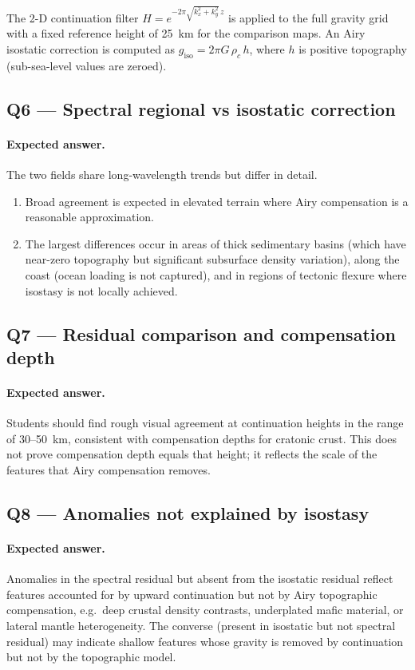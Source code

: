 \documentclass[11pt]{article}
\begin{document}
The 2-D continuation filter $H = e^{-2\pi\sqrt{k_x^2+k_y^2}\,z}$ is applied to
the full gravity grid with a fixed reference height of 25~km for the comparison
maps.  An Airy isostatic correction is computed as
$g_\mathrm{iso} = 2\pi G\,\rho_c\, h$, where $h$ is positive topography
(sub-sea-level values are zeroed).

\subsection*{Q6 — Spectral regional vs isostatic correction}

\paragraph{Expected answer.}
The two fields share long-wavelength trends but differ in detail.
\begin{enumerate}[label=\alph*.]
  \item Broad agreement is expected in elevated terrain where Airy compensation
        is a reasonable approximation.
  \item The largest differences occur in areas of thick sedimentary basins (which
        have near-zero topography but significant subsurface density variation),
        along the coast (ocean loading is not captured), and in regions of
        tectonic flexure where isostasy is not locally achieved.
\end{enumerate}

\subsection*{Q7 — Residual comparison and compensation depth}

\paragraph{Expected answer.}
Students should find rough visual agreement at continuation heights in the range
of 30--50~km, consistent with compensation depths for cratonic crust.  This does
not prove compensation depth equals that height; it reflects the scale of the
features that Airy compensation removes.

\subsection*{Q8 — Anomalies not explained by isostasy}

\paragraph{Expected answer.}
Anomalies in the spectral residual but absent from the isostatic residual reflect
features accounted for by upward continuation but not by Airy topographic
compensation, e.g.\ deep crustal density contrasts, underplated mafic material,
or lateral mantle heterogeneity.  The converse (present in isostatic but not
spectral residual) may indicate shallow features whose gravity is removed by
continuation but not by the topographic model.
\end{document}
